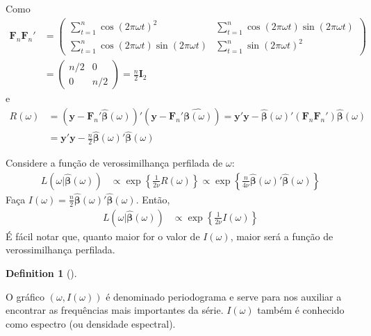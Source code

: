 \documentclass[
  letterpaper,
  DIV=11,
  numbers=noendperiod]{scrartcl}
\theoremstyle{definition}
\theoremstyle{definition}
\newtheorem{definition}{Definition}[chapter]
\theoremstyle{plain}
\theoremstyle{plain}
\theoremstyle{remark}
\begin{document}
Como
\begin{align*}\boldsymbol{F}_n\boldsymbol{F}_n'&=\left(\begin{array}{cc}
\sum_{t=1}^{n}\cos(2\pi\omega t) ^2 & \sum_{t=1}^{n}\cos(2\pi\omega t)\sin(2\pi\omega t) \\
\sum_{t=1}^{n}\cos(2\pi\omega t)\sin(2\pi\omega t) & \sum_{t=1}^{n}\sin(2\pi\omega t)^2
    \end{array}\right) \\&=\left(\begin{array}{cc}n/2 & 0 \\ 0 & n/2\end{array}\right)=\frac{n}{2}\textbf{I}_2
    \end{align*} e \begin{align*}
    R(\omega) &= \left(\boldsymbol{y}- \boldsymbol{F}_n'\hat{\boldsymbol{\beta}}(\omega)\right)'\left(\boldsymbol{y}- \boldsymbol{F}_n'\hat{\boldsymbol{\beta}(\omega)}\right)=\boldsymbol{y}'\boldsymbol{y}-\hat{\boldsymbol{\beta}}(\omega)'(\boldsymbol{F}_n\boldsymbol{F}_n')\hat{\boldsymbol{\beta}}(\omega)\\
    &=\boldsymbol{y}'\boldsymbol{y}-\frac{n}{2}\hat{\boldsymbol{\beta}}(\omega)'\hat{\boldsymbol{\beta}}(\omega)
    \end{align*}

Considere a função de verossimilhança perfilada de \(\omega\):
\begin{align*}
    L(\omega|\hat{\boldsymbol{\beta}}(\omega))&\propto \exp\left\{\frac{1}{2\nu}R(\omega)\right\}\propto\exp\left\{\frac{n}{4\nu}\hat{\boldsymbol{\beta}}(\omega)'\hat{\boldsymbol{\beta}}(\omega)\right\}  \end{align*}
Faça
\(I(\omega)=\frac{n}{2}\hat{\boldsymbol{\beta}}(\omega)'\hat{\boldsymbol{\beta}}(\omega)\).
Então, \begin{align*}
    L(\omega|\hat{\boldsymbol{\beta}}(\omega))&\propto \exp\left\{\frac{1}{2\nu}I(\omega)\right\}\end{align*}
É fácil notar que, quanto maior for o valor de \(I(\omega)\), maior será
a função de verossimilhança perfilada.

\begin{definition}[]\protect\hypertarget{def-periodograma}{}\label{def-periodograma}

O gráfico \((\omega, I(\omega))\) é denominado periodograma e serve para
nos auxiliar a encontrar as frequências mais importantes da série.
\(I(\omega)\) também é conhecido como espectro (ou densidade espectral).

\end{definition}
\end{document}
